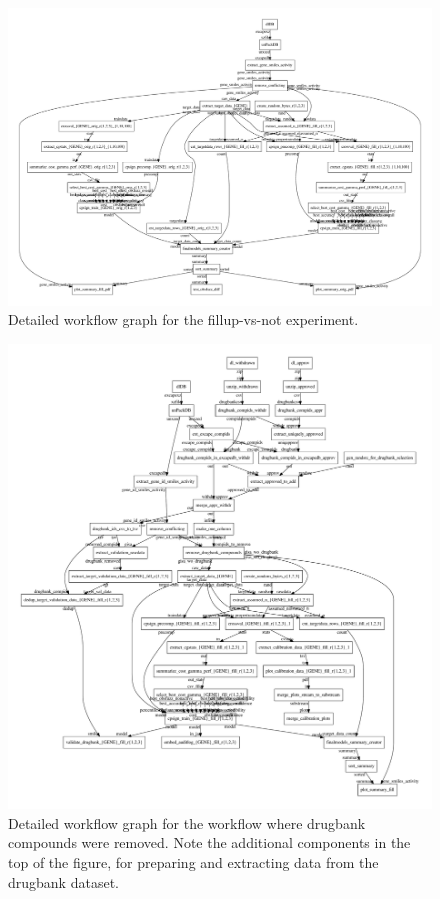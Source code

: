 \documentclass[utf8]{frontiersSCNS} %
\begin{document}
\begin{figure}[h!]
\includegraphics[width=\textwidth]{figures/workflow_graph_fillup_vs_not.pdf}
    \caption{Detailed workflow graph for the fillup-vs-not experiment.}
    \label{fig:workflow_detailed_fillup_vs_not}
\end{figure}

\begin{figure}[h!]
\includegraphics[width=\textwidth]{figures/workflow_graph_wo_drugbank.pdf}
    \caption{Detailed workflow graph for the workflow where drugbank compounds
    were removed. Note the additional components in the top of the figure, for
    preparing and extracting data from the drugbank dataset.}
    \label{fig:workflow_detailed_wo_drugbank}
\end{figure}
\end{document}
